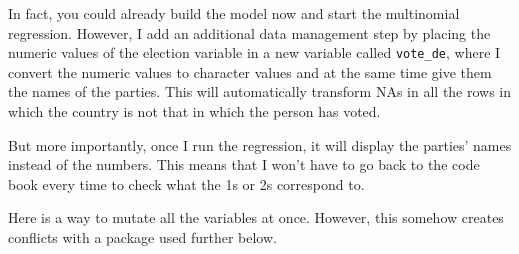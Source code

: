 \documentclass[
  letterpaper,
  DIV=11,
  numbers=noendperiod]{scrreprt}
\newenvironment{Shaded}{\begin{snugshade}}{\end{snugshade}}
\newcommand{\CommentTok}[1]{\textcolor[rgb]{0.37,0.37,0.37}{#1}}
\newcommand{\DecValTok}[1]{\textcolor[rgb]{0.68,0.00,0.00}{#1}}
\newcommand{\NormalTok}[1]{\textcolor[rgb]{0.00,0.23,0.31}{#1}}
\newcommand{\OtherTok}[1]{\textcolor[rgb]{0.00,0.23,0.31}{#1}}
\newcommand{\SpecialCharTok}[1]{\textcolor[rgb]{0.37,0.37,0.37}{#1}}
\newcommand{\StringTok}[1]{\textcolor[rgb]{0.13,0.47,0.30}{#1}}
\begin{document}
In fact, you could already build the model now and start the multinomial
regression. However, I add an additional data management step by placing
the numeric values of the election variable in a new variable called
\texttt{vote\_de}, where I convert the numeric values to character
values and at the same time give them the names of the parties. This
will automatically transform NAs in all the rows in which the country is
not that in which the person has voted.

But more importantly, once I run the regression, it will display the
parties' names instead of the numbers. This means that I won't have to
go back to the code book every time to check what the 1s or 2s
correspond to.

\begin{Shaded}
\end{Shaded}

Here is a way to mutate all the variables at once. However, this somehow
creates conflicts with a package used further below.
\end{document}
